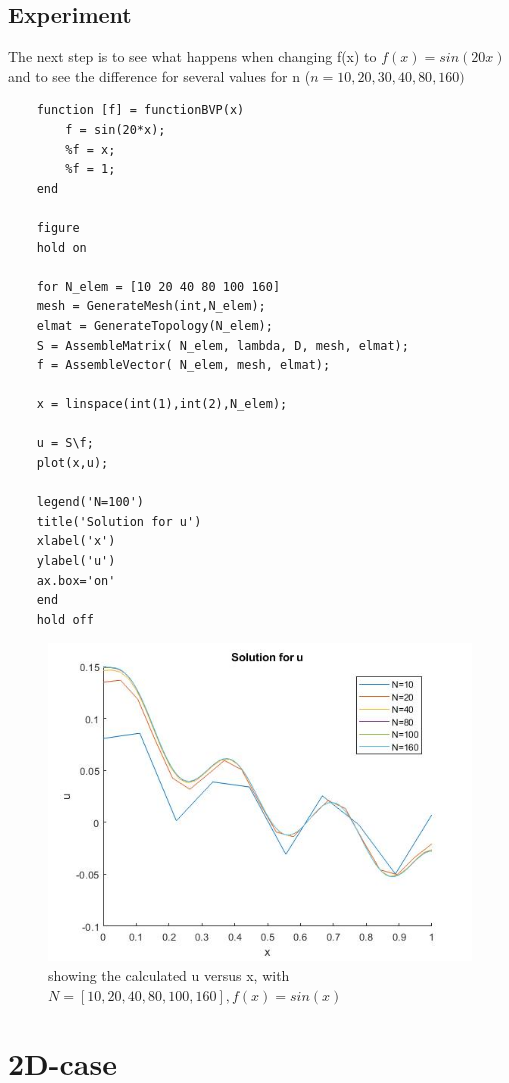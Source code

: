 \documentclass[a4paper]{report}
\begin{document}
\vfill
\section{Experiment}

The next step is to see what happens when changing f(x) to $f(x)=sin(20x)$ and to see the difference for several values for n ($n=10,20,30,40,80,160)$ 

\vspace{5mm}
\begin{lstlisting}
	function [f] = functionBVP(x)
		f = sin(20*x);
		%f = x;
		%f = 1;
	end
	
	figure 
	hold on
	
	for N_elem = [10 20 40 80 100 160]
	mesh = GenerateMesh(int,N_elem);
	elmat = GenerateTopology(N_elem);
	S = AssembleMatrix( N_elem, lambda, D, mesh, elmat);
	f = AssembleVector( N_elem, mesh, elmat);
	
	x = linspace(int(1),int(2),N_elem);
	
	u = S\f;
	plot(x,u);
	
	legend('N=100')
	title('Solution for u')
	xlabel('x')
	ylabel('u')
	ax.box='on'
	end
	hold off
\end{lstlisting}

\newpage

\begin{figure}[ht!]
	\centering
	\includegraphics[width=150mm]{1Dfsinx.jpg}
	\caption{showing the calculated u versus x, with  $N =[10, 20, 40, 80, 100, 160],f(x)=sin(x)$ 
	\label{overflow}}
\end{figure}


\chapter{2D-case}
\end{document}
